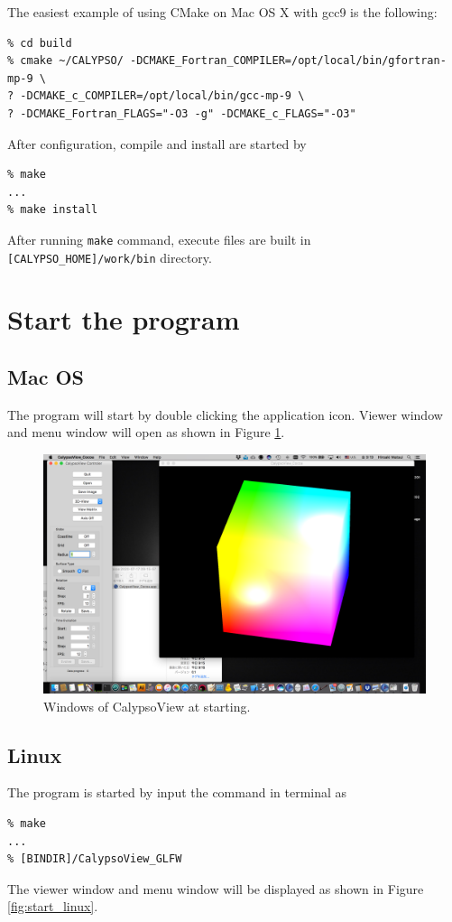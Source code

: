 %
The easiest example of using CMake on Mac OS X with gcc9 is the following:
\begin{verbatim}
% cd build
% cmake ~/CALYPSO/ -DCMAKE_Fortran_COMPILER=/opt/local/bin/gfortran-mp-9 \
? -DCMAKE_c_COMPILER=/opt/local/bin/gcc-mp-9 \
? -DCMAKE_Fortran_FLAGS="-O3 -g" -DCMAKE_c_FLAGS="-O3"
\end{verbatim}
%
After configuration, compile and install are started by
\begin{verbatim}
% make
...
% make install
\end{verbatim}
%

After running \verb|make| command, execute files are built in \verb|[CALYPSO_HOME]/work/bin| directory.

\section{Start the program}
\subsection{Mac OS}
The program will start by double clicking the application icon. Viewer window and menu window will open as shown in Figure \ref{fig:start_mac}.
%
\begin{figure}[htbp]
\begin{center}
\includegraphics*[width=120mm]{images/Desktop_101}
\end{center}
\caption{Windows of CalypsoView at starting.}
\label{fig:start_mac}
\end{figure}
%

\subsection{Linux}
The program is started by input the command in terminal as 
\begin{verbatim}
% make
...
% [BINDIR]/CalypsoView_GLFW
\end{verbatim}
%
The viewer window and menu window will be displayed as shown in Figure \ref{fig:start_linux}.

